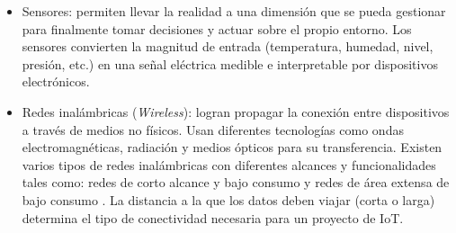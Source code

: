 \begin{itemize}
\item Sensores: permiten llevar la realidad a una dimensión que se pueda gestionar para finalmente tomar decisiones y actuar sobre el propio entorno. Los sensores convierten la magnitud de entrada (temperatura, humedad, nivel, presión, etc.) en una señal eléctrica medible e interpretable por dispositivos electrónicos.

\item Redes inalámbricas (\emph{Wireless}): logran propagar la conexión entre dispositivos a través de medios no físicos. Usan diferentes tecnologías como ondas electromagnéticas, radiación y medios ópticos para su transferencia. Existen varios tipos de redes inalámbricas con diferentes alcances y funcionalidades tales como: redes de corto alcance y bajo consumo y redes de área extensa de bajo consumo \citep{WEBSITE:15}. La distancia a la que los datos deben viajar (corta o larga) determina el tipo de conectividad necesaria para un proyecto de IoT.

\end{itemize}








